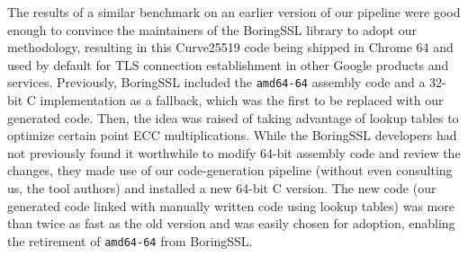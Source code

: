 \documentclass[conference,letterpaper]{IEEEtran}
\begin{document}
The results of a similar benchmark on an earlier version of our pipeline were good enough to convince the maintainers of the BoringSSL library to adopt our methodology, resulting in this Curve25519 code being shipped in Chrome 64 and used by default for TLS connection establishment in other Google products and services.
Previously, BoringSSL included the \texttt{amd64-64} assembly code and a 32-bit C implementation as a fallback, which was the first to be replaced with our generated code.
Then, the idea was raised of taking advantage of lookup tables to optimize certain point ECC multiplications.
While the BoringSSL developers had not previously found it worthwhile to modify 64-bit assembly code and review the changes, they made use of our code-generation pipeline (without even consulting us, the tool authors) and installed a new 64-bit C version.
The new code (our generated code linked with manually written code using lookup tables) was more than twice as fast as the old version and was easily chosen for adoption, enabling the retirement of \texttt{amd64-64} from BoringSSL.

%
%
%
%
%
%
%
%
%
%
\end{document}
